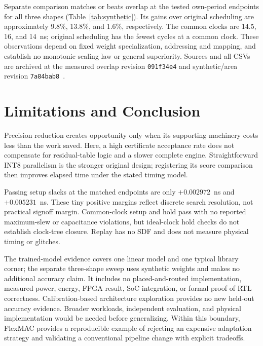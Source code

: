 Separate comparison matches or beats overlap at the tested own-period endpoints
for all three shapes (Table~\ref{tab:synthetic}). Its gains over original
scheduling are approximately 9.8\%, 13.8\%, and 1.6\%, respectively. The common
clocks are 14.5, 16, and 14~ns; original scheduling has the fewest cycles at a
common clock. These observations depend on fixed weight specialization,
addressing and mapping, and establish no monotonic scaling law or general
superiority. Sources and all CSVs are archived at the measured overlap revision
\texttt{091f34e4} and synthetic/area revision \texttt{7a84bab8}~\cite{flexmac}.

\section{Limitations and Conclusion}
Precision reduction creates opportunity only when its supporting machinery costs less than the work saved. Here, a high certificate acceptance rate does not compensate for residual-table logic and a slower complete engine. Straightforward INT8 parallelism is the stronger original design; registering its score comparison then improves elapsed time under the stated timing model.

Passing setup slacks at the matched endpoints are only $+0.002972$~ns and $+0.005231$~ns. These tiny positive margins reflect discrete search resolution, not practical signoff margin. Common-clock setup and hold pass with no reported maximum-slew or capacitance violations, but ideal-clock hold checks do not establish clock-tree closure. Replay has no SDF and does not measure physical timing or glitches.

The trained-model evidence covers one linear model and one typical library corner; the separate three-shape sweep uses synthetic weights and makes no additional accuracy claim. It includes no placed-and-routed implementation, measured power, energy, FPGA result, SoC integration, or formal proof of RTL correctness. Calibration-based architecture exploration provides no new held-out accuracy evidence. Broader workloads, independent evaluation, and physical implementation would be needed before generalizing. Within this boundary, FlexMAC provides a reproducible example of rejecting an expensive adaptation strategy and validating a conventional pipeline change with explicit tradeoffs.
